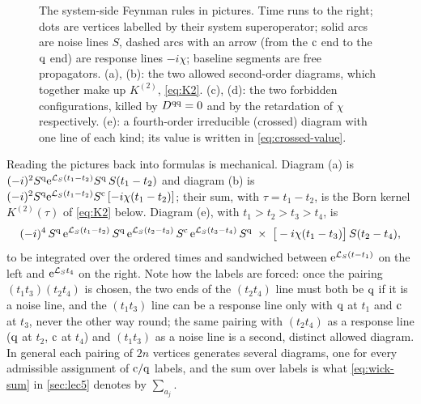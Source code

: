\begin{figure}[t]
\caption{The system-side Feynman rules in pictures.
Time runs to the right; dots are vertices labelled by their system superoperator; solid arcs are noise lines $S$, dashed arcs with an arrow (from the $\mathrm{c}$ end to the $\mathrm{q}$ end) are response lines $-i\chi$; baseline segments are free propagators.
(a), (b): the two allowed second-order diagrams, which together make up $K^{(2)}$, \cref{eq:K2}.
(c), (d): the two forbidden configurations, killed by $D^{\mathrm{q}\mathrm{q}}=0$ and by the retardation of $\chi$ respectively.
(e): a fourth-order irreducible (crossed) diagram with one line of each kind; its value is written in \cref{eq:crossed-value}.}
\label{fig:rules}
\end{figure}

Reading the pictures back into formulas is mechanical.
Diagram (a) is $(-i)^2S^{\mathrm{q}}\mathrm{e}^{\mathcal{L}_S(t_1-t_2)}S^{\mathrm{q}}\,S(t_1-t_2)$ and diagram (b) is $(-i)^2S^{\mathrm{q}}\mathrm{e}^{\mathcal{L}_S(t_1-t_2)}S^{\mathrm{c}}\,[-i\chi(t_1-t_2)]$; their sum, with $\tau=t_1-t_2$, is the Born kernel $K^{(2)}(\tau)$ of \cref{eq:K2} below.
Diagram (e), with $t_1>t_2>t_3>t_4$, is
\begin{equation}
  (-i)^4\,S^{\mathrm{q}}\,\mathrm{e}^{\mathcal{L}_S(t_1-t_2)}\,S^{\mathrm{q}}\,\mathrm{e}^{\mathcal{L}_S(t_2-t_3)}\,S^{\mathrm{c}}\,\mathrm{e}^{\mathcal{L}_S(t_3-t_4)}\,S^{\mathrm{q}}\;\times\;\big[-i\chi(t_1-t_3)\big]\,S(t_2-t_4),
  \label{eq:crossed-value}
\end{equation}
to be integrated over the ordered times and sandwiched between $\mathrm{e}^{\mathcal{L}_S(t-t_1)}$ on the left and $\mathrm{e}^{\mathcal{L}_St_4}$ on the right.
Note how the labels are forced: once the pairing $(t_1t_3)(t_2t_4)$ is chosen, the two ends of the $(t_2t_4)$ line must both be $\mathrm{q}$ if it is a noise line, and the $(t_1t_3)$ line can be a response line only with $\mathrm{q}$ at $t_1$ and $\mathrm{c}$ at $t_3$, never the other way round; the same pairing with $(t_2t_4)$ as a response line ($\mathrm{q}$ at $t_2$, $\mathrm{c}$ at $t_4$) and $(t_1t_3)$ as a noise line is a second, distinct allowed diagram.
In general each pairing of $2n$ vertices generates several diagrams, one for every admissible assignment of $\mathrm{c}/\mathrm{q}$ labels, and the sum over labels is what \cref{eq:wick-sum} in \cref{sec:lec5} denotes by $\sum_{a_j}$.


